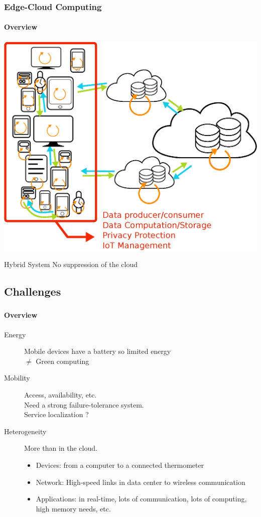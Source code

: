 \documentclass[utf8,xcolor=table, page number]{earlywinter}
\begin{document}
\begin{frame}
\frametitle{Edge-Cloud Computing}
\framesubtitle{Overview}

  \begin{center}
    \includegraphics[width=0.6\linewidth]{edgePrinciple.eps}
  \end{center}
  
  \begin{alertblock}{Hybrid System}
    No suppression of the cloud
  \end{alertblock}

\end{frame}

\subsection{Challenges}


\begin{frame}
  \frametitle{\subsecname}
  \framesubtitle{Overview}
  \begin{description}
    \item[{\color{orange!95!black}Energy}] Mobile devices have a battery so limited energy\\
      $\neq$ Green computing
    \item[{\color{orange!95!black}Mobility}] Access, availability, etc.\\
      Need a strong failure-tolerance system.\\
      Service localization ?
    \item[{\color{orange!95!black}Heterogeneity}] More than in the cloud.\\
      \begin{itemize}
        \item Devices: from a computer to a connected thermometer\\
        \item Network: High-speed links in data center to wireless communication
        \item Applications: in real-time, lots of communication, lots of computing,
      high memory needs, etc.
      \end{itemize}
  \end{description}
\end{frame}
\end{document}
